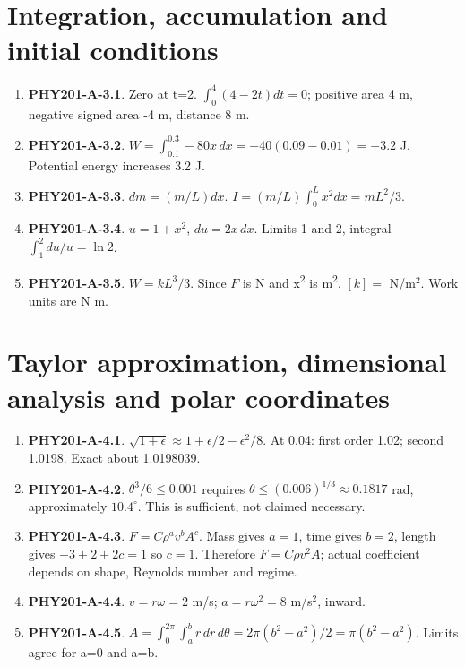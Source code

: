 \documentclass[11pt,a4paper,openany]{book}
\begin{document}
\section{Integration, accumulation and initial conditions}
\begin{enumerate}
\item \textbf{PHY201-A-3.1}. Zero at t=2. $\int_0^4(4-2t)dt=0$; positive area 4 m, negative signed area -4 m, distance 8 m.
\item \textbf{PHY201-A-3.2}. $W=\int_{0.1}^{0.3}-80x\,dx=-40(0.09-0.01)=-3.2$ J. Potential energy increases 3.2 J.
\item \textbf{PHY201-A-3.3}. $dm=(m/L)dx$. $I=(m/L)\int_0^L x^2dx=mL^2/3$.
\item \textbf{PHY201-A-3.4}. $u=1+x^2$, $du=2x\,dx$. Limits 1 and 2, integral $\int_1^2du/u=\ln2$.
\item \textbf{PHY201-A-3.5}. $W=kL^3/3$. Since $F$ is N and x\textsuperscript{2} is m\textsuperscript{2}, $[k]=$ N/m$^2$. Work units are N m.
\end{enumerate}
\section{Taylor approximation, dimensional analysis and polar coordinates}
\begin{enumerate}
\item \textbf{PHY201-A-4.1}. $\sqrt{1+\epsilon}\approx1+\epsilon/2-\epsilon^2/8$. At 0.04: first order 1.02; second 1.0198. Exact about 1.0198039.
\item \textbf{PHY201-A-4.2}. $\theta^3/6\le0.001$ requires $\theta\le(0.006)^{1/3}\approx0.1817$ rad, approximately $10.4^\circ$. This is sufficient, not claimed necessary.
\item \textbf{PHY201-A-4.3}. $F=C\rho^a v^b A^c$. Mass gives $a=1$, time gives $b=2$, length gives $-3+2+2c=1$ so $c=1$. Therefore $F=C\rho v^2 A$; actual coefficient depends on shape, Reynolds number and regime.
\item \textbf{PHY201-A-4.4}. $v=r\omega=2$ m/s; $a=r\omega^2=8$ m/s$^2$, inward.
\item \textbf{PHY201-A-4.5}. $A=\int_0^{2\pi}\int_a^b r\,dr\,d\theta=2\pi(b^2-a^2)/2=\pi(b^2-a^2)$. Limits agree for a=0 and a=b.
\end{enumerate}
\end{document}
